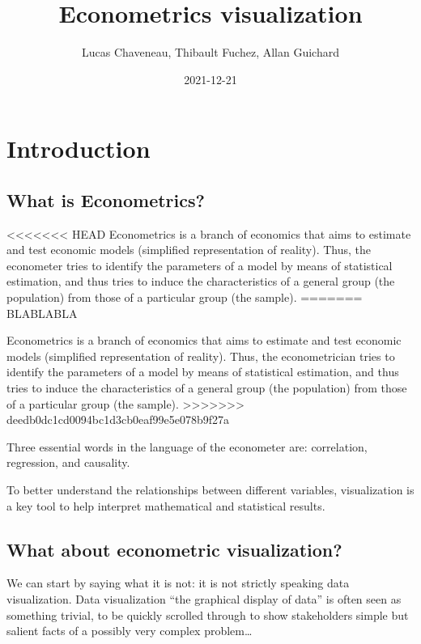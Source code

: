 \documentclass[
]{report}
\title{Econometrics visualization}
\author{Lucas Chaveneau, Thibault Fuchez, Allan Guichard}
\date{2021-12-21}
\begin{document}
\maketitle

{
\setcounter{tocdepth}{1}
\tableofcontents
}
\hypertarget{introduction}{%
\chapter{Introduction}\label{introduction}}

\hypertarget{what-is-econometrics}{%
\section{What is Econometrics?}\label{what-is-econometrics}}

\textless\textless\textless\textless\textless\textless\textless{} HEAD
Econometrics is a branch of economics that aims to estimate and test economic models (simplified representation of reality). Thus, the econometer tries to identify the parameters of a model by means of statistical estimation, and thus tries to induce the characteristics of a general group (the population) from those of a particular group (the sample).
=======
BLABLABLA

Econometrics is a branch of economics that aims to estimate and test economic models (simplified representation of reality). Thus, the econometrician tries to identify the parameters of a model by means of statistical estimation, and thus tries to induce the characteristics of a general group (the population) from those of a particular group (the sample).
\textgreater\textgreater\textgreater\textgreater\textgreater\textgreater\textgreater{} deedb0dc1cd0094bc1d3cb0eaf99e5e078b9f27a

Three essential words in the language of the econometer are: correlation, regression, and causality.

To better understand the relationships between different variables, visualization is a key tool to help interpret mathematical and statistical results.

\hypertarget{what-about-econometric-visualization}{%
\section{What about econometric visualization?}\label{what-about-econometric-visualization}}

We can start by saying what it is not: it is not strictly speaking data visualization.
Data visualization ``the graphical display of data'' is often seen as something trivial, to be quickly scrolled through to show stakeholders simple but salient facts of a possibly very complex problem\ldots{}
\end{document}
